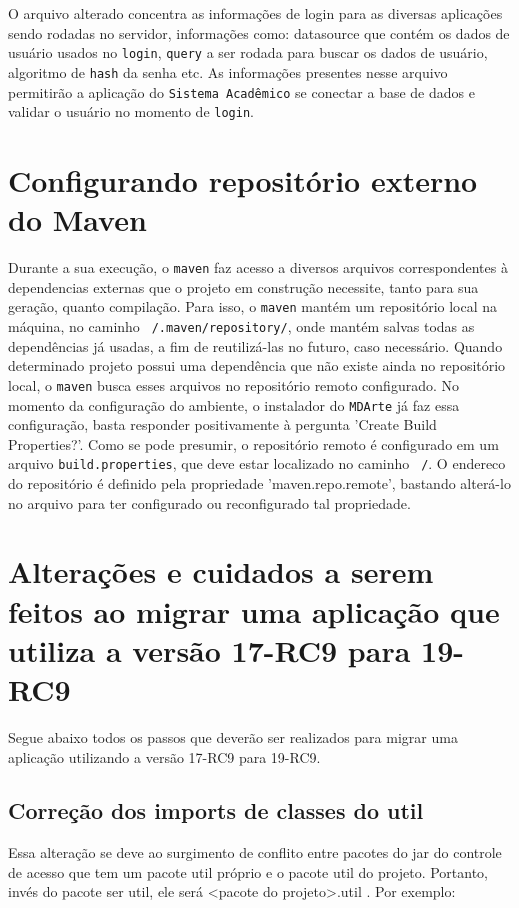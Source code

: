 \begin{framed}
	
\end{framed}

O arquivo alterado concentra as informações de login para as diversas aplicações
sendo rodadas no servidor, informações como: datasource que contém os dados de
usuário usados no \texttt{login}, \texttt{query} a ser rodada para buscar os
dados de usuário, algoritmo de \texttt{hash} da senha etc. As informações
presentes nesse arquivo permitirão a aplicação do \texttt{Sistema Acadêmico} se
conectar a base de dados e validar o usuário no momento de \texttt{login}.

\chapter{Configurando repositório externo do Maven}
\label{maven-config}
Durante a sua execução, o \texttt{maven} faz acesso a diversos arquivos
correspondentes à dependencias externas que o projeto em construção necessite, tanto para sua
geração, quanto compilação. Para isso, o \texttt{maven} mantém um repositório
local na máquina, no caminho \texttt{~/.maven/repository/}, onde mantém salvas todas as
dependências já usadas, a fim de reutilizá-las no futuro, caso necessário.
Quando determinado projeto possui uma dependência que não existe ainda no
repositório local, o \texttt{maven} busca esses arquivos no repositório remoto
configurado.
No momento da configuração do ambiente, o instalador do \texttt{MDArte} já faz
essa configuração, basta responder positivamente à pergunta 'Create Build
Properties?'. Como se pode presumir, o repositório remoto é configurado em um
arquivo \texttt{build.properties}, que deve estar localizado no caminho
\texttt{~/}. O endereco do repositório é definido pela propriedade
'maven.repo.remote', bastando alterá-lo no arquivo para ter configurado ou
reconfigurado tal propriedade.

\chapter{Alterações e cuidados a serem feitos ao migrar uma aplicação que
utiliza a versão 17-RC9 para 19-RC9}

Segue abaixo todos os passos que deverão ser realizados para migrar uma aplicação utilizando a versão 17-RC9 para 19-RC9.

\section{Correção dos imports de classes do util}
Essa alteração se deve ao surgimento de conflito entre pacotes do jar do
controle de acesso que tem um pacote util próprio e o pacote util do projeto. Portanto, invés do pacote ser util, ele será <pacote do projeto>.util . Por exemplo:

